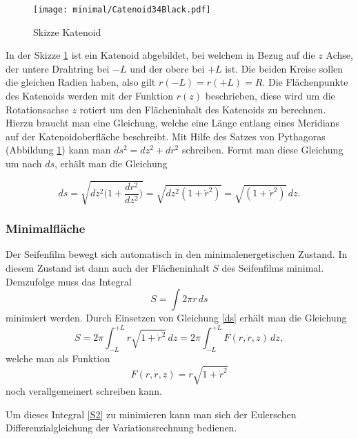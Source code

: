\begin{refsection}
\begin{figure}
  \centering
  \texttt{[image: minimal/Catenoid34Black.pdf]}
  \caption{Skizze Katenoid} 
  \label{Katenoid}
\end{figure}
In der Skizze \ref{Katenoid} ist ein Katenoid abgebildet, bei welchem in Bezug auf die $z$ Achse, der untere Drahtring bei $-L$ und der obere bei $+L$ ist. 
Die beiden Kreise sollen die gleichen Radien haben, also gilt $r(-L)=r(+L)=R$. 
Die Flächenpunkte des Katenoids werden mit der Funktion $r(z)$ beschrieben, diese wird um die Rotationsachse $z$ rotiert um den Flächeninhalt des Katenoids zu berechnen.
Hierzu braucht man eine Gleichung, welche eine Länge entlang eines Meridians auf der Katenoidoberfläche beschreibt. 
Mit Hilfe des Satzes von Pythagoras (Abbildung \ref{Katenoid}) kann man $ds^2=dz^2+dr^2$ schreiben.
Formt man diese Gleichung um nach $ds$, erhält man die Gleichung

\begin{equation} \label{ds}
  ds=\sqrt{dz^2\bigg(1+\frac{dr^2}{dz^2}\bigg)}= \sqrt{dz^2(1+\dot r^2)}=\sqrt{(1+\dot r^2)}\,dz .
\end{equation}
\subsubsection{Minimalfläche}
Der Seifenfilm bewegt sich automatisch in den minimalenergetischen Zustand. 
In diesem Zustand ist dann auch der Flächeninhalt $S$ des Seifenfilms minimal.
Demzufolge muss das Integral 
\begin{equation} \label{S1}  
  S= \int 2 \pi r \,ds 
\end{equation}
minimiert werden. 
Durch Einsetzen von Gleichung \eqref{ds} erhält man die Gleichung 
\begin{equation} \label{S2}
  S=2 \pi \int_{-L}^{+L} r\sqrt{1+\dot r^2}\,dz =2 \pi \int_{-L}^{+L}  F(r,\dot r, z) \,dz  ,
\end{equation}
welche man als Funktion 
\begin{equation} \label{F}
 F(r,\dot r, z) = r \sqrt{1+\dot r^2}
\end{equation}
noch verallgemeinert schreiben kann.



Um dieses Integral \eqref{S2} zu minimieren kann man sich der Eulerschen Differenzialgleichung der Variationsrechnung bedienen. 

\end{refsection}
